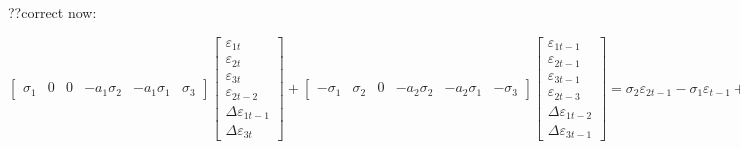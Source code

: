 \documentclass[a4paper,12pt]{article}
\begin{document}
\bigskip

\bigskip

\bigskip


??correct now:

$%
\begin{bmatrix}
\sigma _{1} & 0 & 0 & -a_{1}\sigma _{2} & -a_{1}\sigma _{1} & \sigma _{3}%
\end{bmatrix}%
\begin{bmatrix}
\varepsilon _{1t} \\ 
\varepsilon _{2t} \\ 
\varepsilon _{3t} \\ 
\varepsilon _{2t-2} \\ 
\Delta \varepsilon _{1t-1} \\ 
\Delta \varepsilon _{3t}%
\end{bmatrix}%
+%
\begin{bmatrix}
-\sigma _{1} & \sigma _{2} & 0 & -a_{2}\sigma _{2} & -a_{2}\sigma _{1} & 
-\sigma _{3}%
\end{bmatrix}%
\begin{bmatrix}
\varepsilon _{1t-1} \\ 
\varepsilon _{2t-1} \\ 
\varepsilon _{3t-1} \\ 
\varepsilon _{2t-3} \\ 
\Delta \varepsilon _{1t-2} \\ 
\Delta \varepsilon _{3t-1}%
\end{bmatrix}%
=\allowbreak \sigma _{2}\varepsilon _{2t-1}-\sigma _{1}\varepsilon
_{t-1}+\sigma _{1}\varepsilon _{t}+\Delta \sigma _{3}\varepsilon
_{3t}-\Delta \sigma _{3}\varepsilon _{3t-1}-\sigma _{2}a_{1}\varepsilon
_{2t-2}-\sigma _{2}a_{2}\varepsilon _{2t-3}-\Delta \sigma
_{1}a_{1}\varepsilon _{t-1}-\Delta \sigma _{1}a_{2}\varepsilon
_{t-2}\allowbreak $

\EAW

\bigskip
\end{document}
